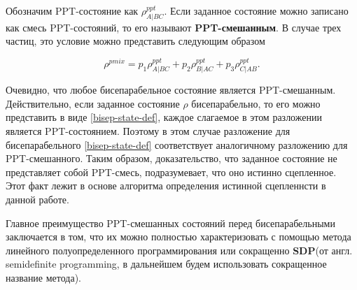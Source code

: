Обозначим PPT-состояние как $\rho_{A | BC}^{ppt}$. Если  заданное состояние можно записано как смесь PPT-состояний, то его называют \textbf{PPT-смешанным}. В случае трех частиц, это условие можно представить следующим образом

\begin{equation}\label{three-ppt-mix-def}
    \rho^{pmix} = p_1 \rho_{A | BC}^{ppt} + 
    p_2 \rho_{B | AC}^{ppt} + 
    p_3 \rho_{C | AB}^{ppt}.
\end{equation}


Очевидно, что любое бисепарабельное состояние является PPT-смешанным. Действительно, если заданное состояние $\rho$ бисепарабельно, то его можно представить в виде \ref{bisep-state-def}, каждое слагаемое в этом разложении является PPT-состоянием. Поэтому в этом случае разложение для бисепарабельного \ref{bisep-state-def} соответствует аналогичному разложению для PPT-смешанного. Таким образом, доказательство, что заданное состояние не представляет собой PPT-смесь, подразумевает, что оно истинно сцепленное. Этот факт лежит в основе алгоритма определения истинной сцепленнсти в данной работе.


Главное преимущество PPT-смешанных состояний перед бисепарабельными заключается в том, что их можно полностью характеризовать  с помощью метода линейного полуопределенного программирования или сокращенно \textbf{SDP}(от англ. semidefinite programming, в дальнейшем будем использовать сокращенное название метода).